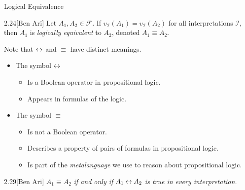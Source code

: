 \begin{wideslide}[bm=,toc=]{Logical Equivalence}
\begin{defn}{2.24}[Ben Ari]
Let $A_1,A_2 \in \mathcal{F}$. If $v_{\mathcal{I}}(A_1) = v_{\mathcal{I}}(A_2)$
  for all interpretations $\mathcal{I}$, then $A_1$ is \emph{logically
    equivalent} to $A_2$, denoted $A_1 \equiv A_2$. 
\end{defn}
Note that $\mathbin{\leftrightarrow}$ and $\equiv$ have distinct meanings.
\begin{itemize}
\item The symbol $\mathbin{\leftrightarrow}$
\begin{itemize}
\item Is a Boolean operator in propositional logic.
\item Appears in formulas of the logic.
\end{itemize}

\item The symbol $\equiv$
\begin{itemize}
\item Is not a Boolean operator.
\item Describes a property of pairs of formulas in propositional logic.
\item Is part of the \emph{metalanguage} we use to reason about propositional
logic.
\end{itemize}
\end{itemize}

\begin{thm}{2.29}[Ben Ari]
  $A_1 \equiv A_2$ \emph{if and only if} $A_1 \mathbin{\leftrightarrow} A_2$ \emph{is true in every
    interpretation.}
\end{thm}
\end{wideslide}

